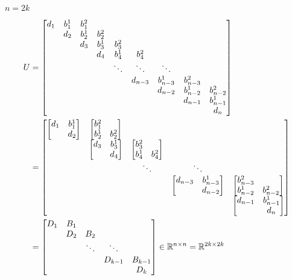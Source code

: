 \documentclass[11pt]{article}
\begin{document}


$n = 2k$

\begin{align*}
    U &= \mqty[
        d_{1} & b^{1}_{1} & b^{2}_{1} &   &   &   &   &   &  \\
          & d_{2} & b^{1}_{2} & b^{2}_{2} &   &   &   &   &  \\
          &   & d_{3} & b^{1}_{3} & b^{2}_{3} &   &   &   &  \\
          &   &   & d_{4} & b^{1}_{4} & b^{2}_{4} &   &   &  \\
          &   &   &   & \ddots & \ddots & \ddots &   &  \\
          &   &   &   &   & d_{n-3} & b^{1}_{n-3} & b^{2}_{n-3} &  \\
          &   &   &   &   &   & d_{n-2} & b^{1}_{n-2} & b^{2}_{n-2}\\
          &   &   &   &   &   &   & d_{n-1} & b^{1}_{n-1}\\
          &   &   &   &   &   &   &   & d_{n}
    ]\\
    &= \mqty[
        \mqty[d_{1} & b^{1}_{1} \\ & d_{2}] & \mqty[b^{2}_{1} &  \\ b^{1}_{2} & b^{2}_{2}] &   &   &  \\
          & \mqty[d_{3} & b^{1}_{3} \\ & d_{4}] & \mqty[b^{2}_{3} & \\ b^{1}_{4} & b^{2}_{4}] &   &  \\
          &   & \ddots & \ddots &  \\
          &   &   & \mqty[d_{n-3} & b^{1}_{n-3} \\ & d_{n-2}] & \mqty[b^{2}_{n-3} & \\ b^{1}_{n-2} & b^{2}_{n-2}] \\
          &   &   &   & \mqty[d_{n-1} & b^{1}_{n-1}\\ & d_{n}]
    ]\\
    &= \mqty[
        D_{1} & B_{1} &   &   &  \\
          & D_{2} & B_{2} &   &  \\
          &   & \ddots & \ddots &  \\
          &   &   & D_{k-1} & B_{k-1}\\
          &   &   &   & D_{k}
    ] \in \mathbb{R}^{n \times n} = \mathbb{R}^{2k \times 2k}
\end{align*}
\end{document}
